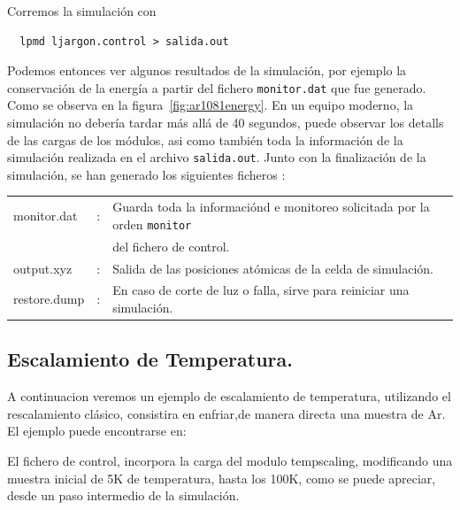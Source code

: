 Corremos la simulaci\'on con 
\begin{verbatim}
  lpmd ljargon.control > salida.out
\end{verbatim}


Podemos entonces ver algunos resultados de la simulaci\'on, por ejemplo la conservaci\'on de la energ\'ia a partir del fichero \verb|monitor.dat| que fue generado. Como se observa en la figura~\ref{fig:ar1081energy}. En un equipo moderno, la simulaci\'on no deber\'ia tardar m\'as all\'a de 40 segundos, puede observar los detalls de las cargas de los m\'odulos, asi como tambi\'en toda la informaci\'on de la simulaci\'on realizada en el archivo \verb|salida.out|. Junto con la finalizaci\'on de la simulaci\'on, se han generado los siguientes ficheros :

\begin{tabular}{lcl}\\
 monitor.dat &:& Guarda toda la informaci\'ond e monitoreo solicitada por la orden \verb|monitor|\\
&& del fichero de control. \\
 output.xyz &:& Salida de las posiciones at\'omicas de la celda de simulaci\'on. \\
 restore.dump &:& En caso de corte de luz o falla, sirve para reiniciar una simulaci\'on.\\
\end{tabular}

\subsection{Escalamiento de Temperatura.}

A continuacion veremos un ejemplo de escalamiento de temperatura, utilizando el rescalamiento cl\'asico, consistira en enfriar,de manera directa una muestra de Ar. El ejemplo puede encontrarse en:


El fichero de control, incorpora la carga del modulo tempscaling, modificando una muestra inicial de 5K de temperatura, hasta los 100K, como se puede apreciar, desde un paso intermedio de la simulaci\'on.

